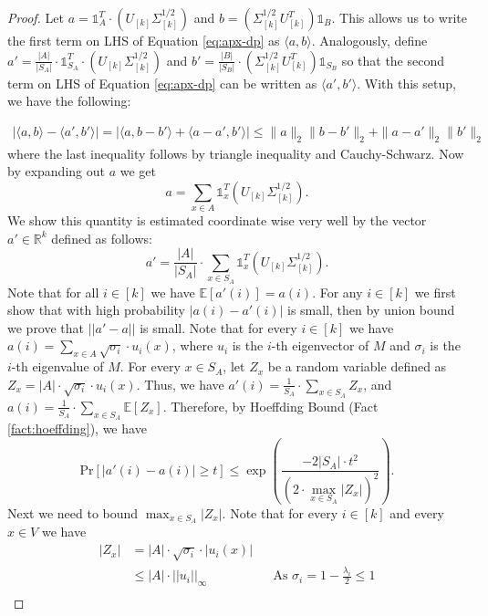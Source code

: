 \documentclass[letterpaper,11pt]{article}
\newcommand{\E}{\mathbb{E}}
\newcommand{\R}{\mathbb{R}}
\newcommand{\inner}[2]{\langle #1, #2 \rangle}
\theoremstyle{plain}
\theoremstyle{definition}
\theoremstyle{remark}
\begin{document}
\begin{proof}
	Let $a = \mathds{1}_A^T \cdot (U_{[k]}\Sigma_{[k]}^{1/2})$ and 
	$b = (\Sigma_{[k]}^{1/2}U_{[k]}^T) \mathds{1}_B$. This allows us
	to write the first term on LHS of Equation \eqref{eq:apx-dp} as $\inner{a}{b}$. 
	Analogously, define $a' = \frac{|A|}{|S_A|} \cdot \mathds{1}_{S_A}^T \cdot (U_{[k]} \Sigma_{[k]}^{1/2})$
	and $b' = \frac{|B|}{|S_B|} \cdot (\Sigma_{[k]}^{1/2}U_{[k]}^T) \mathds{1}_{S_B}$ so that
	the second term on LHS of Equation \eqref{eq:apx-dp} can be written as $\inner{a'}{b'}$. With this setup, we have the following:

	\begin{align}
		\left|\inner{a}{b} - \inner{a'}{b'} \right| = \left|\inner{a}{b-b'} + \inner{a-a'}{b'} \right| \leq \|a\|_2\|b-b'\|_2 + \|a-a'\|_2\|b'\|_2 \label{eq:upperbd-apx-dp}
	\end{align}
	where the last inequality follows by triangle inequality and Cauchy-Schwarz. Now by expanding out $a$ we get 
	\[a = \sum_{x \in A} \mathds{1}_x^T \left(U_{[k]}\Sigma_{[k]}^{1/2}\right) \text{.}\]
We show this quantity is estimated coordinate wise very well by the vector $a'\in \R^k$ defined as follows: 
\[a'= \frac{|A|}{|S_A|} \cdot \sum_{x \in S_A} \mathds{1}_x^T \left(U_{[k]}\Sigma_{[k]}^{1/2}\right) \text{.}\] 
Note that for all $i \in [k]$ we have $\E[a'(i)] = a(i)$. For any $i \in [k]$ we first show that with high probability $|a(i)-a'(i)|$ is small,  then by union bound we prove that $||a'-a||$ is small. Note that for every $i\in [k]$ we have $a(i)=\sum_{x \in A} \sqrt{\sigma_i}\cdot u_i(x)$, where $u_i$ is the $i$-th eigenvector of $M$ and $\sigma_i$ is the $i$-th eigenvalue of $M$. For every $x\in S_A$, let $Z_x$ be a random variable defined as $Z_x= |A|\cdot  \sqrt{\sigma_i}\cdot u_i(x)$. Thus, we have $a'(i)=\frac{1}{S_A}\cdot \sum_{x\in S_A} Z_x$, and $a(i)=\frac{1}{S_A}\cdot \sum_{x\in S_A} \E[Z_x]$. Therefore, by Hoeffding Bound 
	(Fact \ref{fact:hoeffding}), we have
	\begin{equation}
	\label{eq:hoef}
	\text{Pr} \left[|a'(i) - a(i)| \geq t \right] \leq \exp\left(\frac{-2|S_A| \cdot t^2}{\left(2 \cdot \max_{x\in S_A} |Z_x| \right)^2}\right). 
	\end{equation}
Next we need to bound $\max_{x\in S_A} |Z_x|$. Note that for every $i\in[k]$ and every $x\in V$ we have
	\begin{align}
	\label{eq:max-zx}
		|Z_x| &= |A|\cdot \sqrt {\sigma_i}\cdot |u_i(x)| \nonumber\\
		&\leq |A|\cdot ||u_i||_{\infty} &&\text{As $\sigma_i =1-\frac{\lambda_i}{2}\leq 1$} \nonumber\\

\end{align}
\end{proof}
\end{document}
